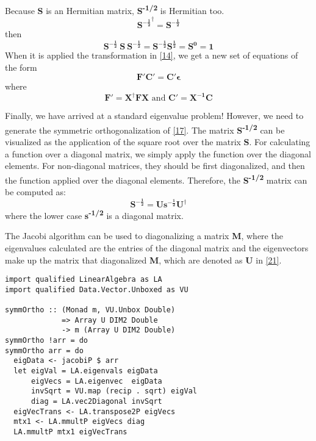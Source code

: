 \documentclass{tmr}
\begin{document}
Because \textbf{S} is an Hermitian matrix, \textbf{S\textsuperscript{-1/2}} is Hermitian too.
\[ \mathbf{{S^{-\frac{1}{2}}}^{\dagger}} = \mathbf{S^{-\frac{1}{2}}} \]
then
\[ \mathbf{S^{-\frac{1}{2}}\ S\ S^{-\frac{1}{2}}} =  \mathbf{S^{-\frac{1}{2}} S^{\frac{1}{2}}}
= \mathbf{S^0} = \mathbf{1}
\]
When it is applied the transformation in \eqref{14},
we get a new set of equations of the form
\begin{equation}\label{19}
\mathbf{F'C'} = \mathbf{C'\epsilon} 
\end{equation}
where 
\begin{equation}\label{20}
\mathbf{F'} = \mathbf{X^{\dagger}FX} \text{ and }  \mathbf{C'} = \mathbf{X^{-1}C}
\end{equation}

Finally, we have arrived at a standard eigenvalue problem! However, we need to generate
the symmetric orthogonalization of \eqref{17}. The
matrix \textbf{S\textsuperscript{-1/2}} can be visualized as the application of the 
square root over the matrix \textbf{S}. For calculating a
function over a diagonal matrix, we simply apply the function
over the diagonal elements. For non-diagonal matrices, they should be first diagonalized, and
then the function applied over the diagonal elements. Therefore, the \textbf{S\textsuperscript{-1/2}}
matrix can be computed as:
\begin{equation}\label{21}
\mathbf{S^{-\frac{1}{2}}} = \mathbf{U{s^{-\frac{1}{2}}}U^{\dagger}}
\end{equation}
where the lower case \textbf{s\textsuperscript{-1/2}} is a diagonal matrix.

\par The Jacobi algorithm can be used to diagonalizing a matrix \textbf{M},
where the eigenvalues calculated are the entries of the diagonal matrix
and the eigenvectors make up the matrix that diagonalized \textbf{M},
which are denoted as \textbf{U} in \eqref{21}. 

\begin{lstlisting}[float,captionpos=b,belowcaptionskip=4pt, caption= Symmetric Orthogonalization]
import qualified LinearAlgebra as LA
import qualified Data.Vector.Unboxed as VU

symmOrtho :: (Monad m, VU.Unbox Double) 
             => Array U DIM2 Double 
             -> m (Array U DIM2 Double)
symmOrtho !arr = do
symmOrtho arr = do
  eigData <- jacobiP $ arr
  let eigVal = LA.eigenvals eigData
      eigVecs = LA.eigenvec  eigData
      invSqrt = VU.map (recip . sqrt) eigVal
      diag = LA.vec2Diagonal invSqrt
  eigVecTrans <- LA.transpose2P eigVecs
  mtx1 <- LA.mmultP eigVecs diag
  LA.mmultP mtx1 eigVecTrans
\end{lstlisting}
\end{document}
